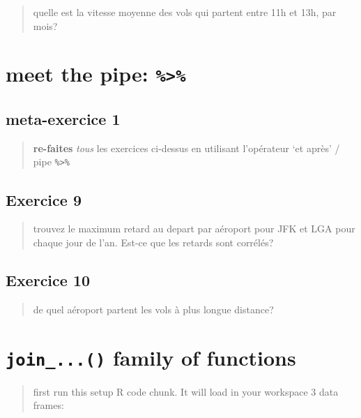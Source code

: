\documentclass[
]{article}
\begin{document}
\begin{quote}
quelle est la vitesse moyenne des vols qui partent entre 11h et 13h, par
mois?
\end{quote}

\hypertarget{meet-the-pipe}{%
\section{\texorpdfstring{meet the pipe:
\texttt{\%\textgreater{}\%}}{meet the pipe: \%\textgreater\%}}\label{meet-the-pipe}}

\hypertarget{meta-exercice-1}{%
\subsection{meta-exercice 1}\label{meta-exercice-1}}

\begin{quote}
\textbf{re-faites} \emph{tous} les exercices ci-dessus en utilisant
l'opérateur `et après' / pipe \texttt{\%\textgreater{}\%}
\end{quote}

\hypertarget{exercice-9}{%
\subsection{Exercice 9}\label{exercice-9}}

\begin{quote}
trouvez le maximum retard au depart par aéroport pour JFK et LGA pour
chaque jour de l'an. Est-ce que les retards sont corrélés?
\end{quote}

\hypertarget{exercice-10}{%
\subsection{Exercice 10}\label{exercice-10}}

\begin{quote}
de quel aéroport partent les vols à plus longue distance?
\end{quote}

\hypertarget{join_...-family-of-functions}{%
\section{\texorpdfstring{\texttt{join\_...()} family of
functions}{join\_...() family of functions}}\label{join_...-family-of-functions}}

\begin{quote}
first run this setup R code chunk. It will load in your workspace 3 data
frames:
\end{quote}
\end{document}

